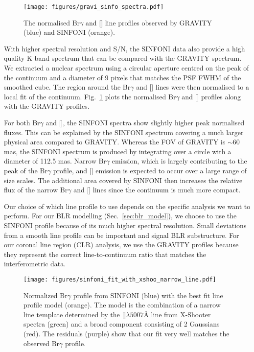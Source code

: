 \documentclass[longauth,]{aa}
\newcommand{\brg}{Br$\gamma$}
\newcommand{\caviii}{[\ion{Ca}{viii}]}
\begin{document}
\begin{figure}
    \centering
    \texttt{[image: figures/gravi\_sinfo\_spectra.pdf]}
    \caption{The normalised \brg{} and \caviii{} line profiles observed by GRAVITY (blue) and SINFONI (orange).}
    \label{fig:flux_spec}
\end{figure}

With higher spectral resolution and S/N, the SINFONI data also provide a high quality K-band spectrum that can be compared with the GRAVITY spectrum. We extracted a nuclear spectrum using a circular aperture centred on the peak of the continuum and a diameter of 9 pixels that matches the PSF FWHM of the smoothed cube. The region around the \brg{} and \caviii{} lines were then normalised to a local fit of the continuum. Fig.~\ref{fig:flux_spec} plots the normalised \brg{} and \caviii{} profiles along with the GRAVITY profiles.

For both \brg{} and \caviii{}, the SINFONI spectra show slightly higher peak normalised fluxes. This can be explained by the SINFONI spectrum covering a much larger physical area compared to GRAVITY. Whereas the FOV of GRAVITY is $\sim60$ mas, the SINFONI spectrum is produced by integrating over a circle with a diameter of 112.5 mas. Narrow \brg{} emission, which is largely contributing to the peak of the \brg{} profile, and \caviii{} emission is expected to occur over a large range of size scales. The additional area covered by SINFONI then increases the relative flux of the narrow \brg{} and \caviii{} lines since the continuum is much more compact.

Our choice of which line profile to use depends on the specific analysis we want to perform. For our BLR modelling (Sec.~\ref{sec:blr_model}), we choose to use the SINFONI profile because of its much higher spectral resolution. Small deviations from a smooth line profile can be important and signal BLR substructure. For our coronal line region (CLR) analysis, we use the GRAVITY profiles because they represent the correct line-to-continuum ratio that matches the interferometric data. 

\begin{figure}
    \centering
    \texttt{[image: figures/sinfoni\_fit\_with\_xshoo\_narrow\_line.pdf]}
    \caption{Normalized \brg{} profile from SINFONI (blue) with the best fit line profile model (orange). The model is the combination of a narrow line template determined by the []$\lambda5007$\AA{} line from X-Shooter spectra (green) and a broad component consisting of 2 Gaussians (red). The residuals (purple) show that our fit very well matches the observed \brg{} profile.}
    \label{fig:sinfoni_line_fit}
\end{figure}
\end{document}
